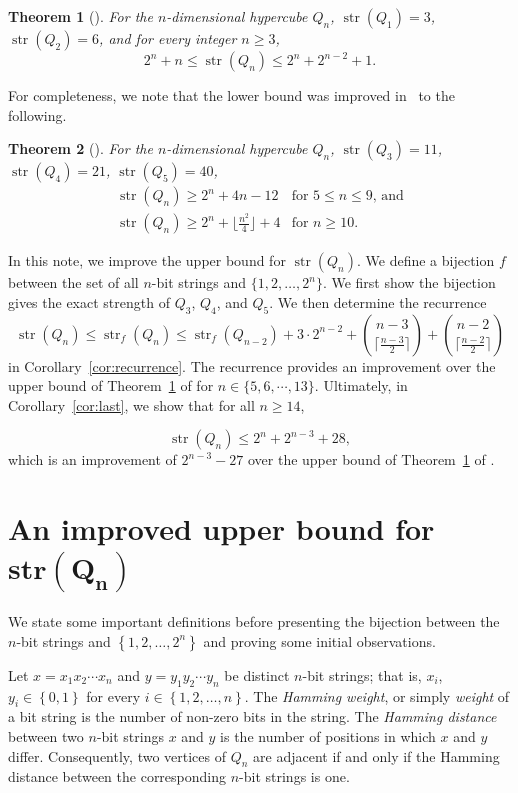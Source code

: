 \documentclass[12pt]{article}
\newtheorem{theorem}{Theorem}[section]
\DeclareMathOperator{\str}{str}
\begin{document}
\begin{theorem}[\cite{I.2018}]\label{Hyper} For the $n$-dimensional hypercube $Q_n$, $\str(Q_1)=3$, $\str(Q_2)=6$, and for every integer $n \geq 3$, $$2^n+n \leq \str(Q_n) \leq 2^n+2^{n-2}+1.$$\end{theorem}

For completeness, we note that the lower bound was improved in~\cite[Theorems 16, 17, and Corollary 18]{G.L.S.2021} to the following.

\begin{theorem}[\cite{G.L.S.2021}]\label{G.L.S.2021} For the $n$-dimensional hypercube $Q_n$,  $\str(Q_3) = 11$, $\str(Q_4) = 21$, $\str(Q_5) = 40$, $$\begin{array}{ll}\str(Q_n) \geq 2^n+4n-12 & \text{for $5 \leq n \leq 9$, and} \\
\str(Q_n) \geq 2^n+\lfloor \frac{n^2}{4}\rfloor +4 & \text{for $n \geq 10$.}\end{array}$$
\end{theorem}

In this note, we improve the upper bound for $\str(Q_n)$. We define a bijection $f$ between the set of all $n$-bit strings and $\{1,2,\dots,2^{n}\}$.  We first show the bijection gives the exact strength of $Q_3$, $Q_4$, and $Q_5$. We then determine the recurrence 
$$\str(Q_{n}) \leq \str_f(Q_{n}) \leq \str_f(Q_{n-2}) + 3 \cdot 2^{n-2} + \binom{n-3}{\lceil \frac{n-3}{2}\rceil}+\binom{n-2}{\lceil \frac{n-2}{2}\rceil}$$ in Corollary~\ref{cor:recurrence}. The recurrence provides an improvement over the upper bound of Theorem~\ref{Hyper} of \cite{I.2018} for $n \in \{5,6,\cdots,13\}$.  Ultimately, in Corollary~\ref{cor:last}, we show that for all $n \geq 14$, 

$$\str(Q_n) \leq 2^n+2^{n-3}+28,$$ which is an improvement of $2^{n-3}-27$ over the upper bound of Theorem~\ref{Hyper} of \cite{I.2018}. 

\section{An improved upper bound for $\mathbf{str(Q_n)}$}\label{sec:defn}

We state some important definitions before presenting the bijection between the $n$-bit strings and $\left\{1, 2, \ldots ,2^n\right\}$ and proving some initial observations.

Let $x=x_1x_2\cdots x_n$ and $y=y_1y_2\cdots y_n$ be distinct $n$-bit strings; that is, $x_i$, $y_i \in \left\{0,1\right\}$ for every $i\in \left\{1,2,\ldots , n\right\}$. The \emph{Hamming weight}, or simply \emph{weight} of a bit string is the number of non-zero bits in the string. The \emph{Hamming distance} between two $n$-bit strings $x$ and $y$ is the number of positions in which $x$ and $y$ differ. Consequently, two vertices of $Q_n$ are adjacent if and only if the Hamming distance between the corresponding $n$-bit strings is one.  
\end{document}
